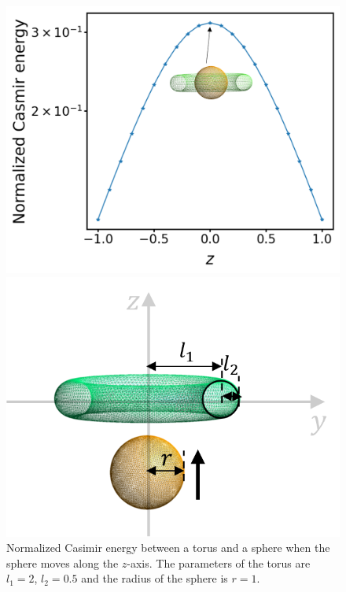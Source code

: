\begin{figure}[H]
\centering
\begin{minipage}{.65\textwidth}
  \centering
  \includegraphics[width=\textwidth]{figures/Torus_sphere_CasE.png}
\end{minipage}%
\begin{minipage}{.35\textwidth}
  \centering
  \vspace*{-0.6cm}
  \includegraphics[width=\textwidth]{figures/Sphere_torus.png}
\end{minipage}
\caption{Normalized Casimir energy between a torus and a sphere when the sphere moves along the $z$-axis. The parameters of the torus are $l_1 = 2$, $l_2 = 0.5$ and the radius of the sphere is $r = 1$.}
\label{fig:Torus_sphere_CasE}
\end{figure}


